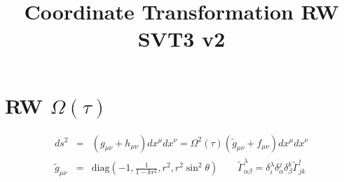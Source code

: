 \documentclass[10pt,letterpaper]{article}
\title{Coordinate Transformation RW SVT3 v2}
\date{}
\numberwithin{equation}{section}
\begin{document}
 
\maketitle
\noindent 
\section{RW $\Omega(\tau)$}
\begin{eqnarray}
ds^2 &=& (g_{\mu\nu} + h_{\mu\nu})dx^\mu dx^\nu = \Omega^2(\tau)(\tilde g_{\mu\nu} + f_{\mu\nu})dx^\mu dx^\nu
\\
\tilde g_{\mu\nu} &=& \text{diag}\left(-1,\frac{1}{1-kr^2},r^2,r^2\sin^2\theta\right)\qquad \tilde \Gamma^{\lambda}_{\alpha\beta} = \delta^\lambda_i \delta^j_\alpha \delta^k_\beta \tilde \Gamma^{i}_{jk}
\end{eqnarray}
%
\end{document}

